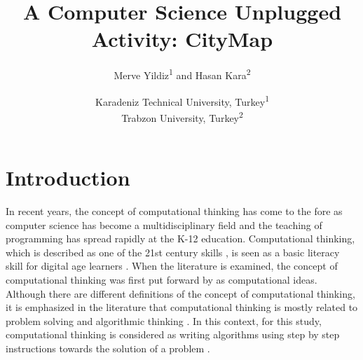 \documentclass[12pt]{article}
\title{A Computer Science Unplugged Activity: CityMap}
\author{Merve Yildiz\textsuperscript{1} and Hasan Kara\textsuperscript{2}}
\date{Karadeniz Technical University, Turkey\textsuperscript{1} \\Trabzon University, Turkey\textsuperscript{2}}
\begin{document}
\maketitle

\section{Introduction}
In recent years, the concept of computational thinking has come to the fore as computer science has become a multidisciplinary 
field and the teaching of programming has spread rapidly at the K-12 education. Computational thinking, which is described as 
one of the 21st century skills \cite{sharif_university_of_technology_computational_2017} , is seen as a basic literacy skill for 
digital age learners \cite{nishida_new_2008}. When the literature is examined, the concept of computational thinking was first 
put forward by \cite{bell_computer_2012} as computational ideas. Although there are different definitions of the concept of 
computational thinking, it is emphasized in the literature that computational thinking is mostly related to problem solving and 
algorithmic thinking \cite{sendurur_investigation_2019, srivastava_assessing_2019}. In this context, for this study, 
computational thinking is considered as writing algorithms using step by step instructions towards the solution of a problem 
\cite{alayrangues_informatique_2017}.


\printbibliography[title={References}]
\end{document}
